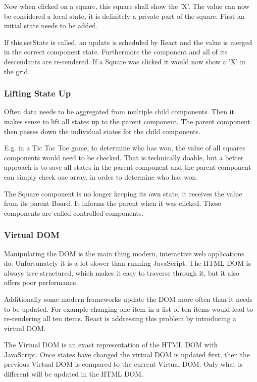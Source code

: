 Now when clicked on a square, this square shall show the 'X'. The value can now be considered a local state, it is definitely a private part of the square. First an initial state needs to be added.



If this.setState is called, an update is scheduled by React and the value is merged in the correct component state. Furthermore the component and all of its descendants are re-rendered. If a Square was clicked it would now show a 'X' in the grid.

\subsubsection{Lifting State Up}
Often data needs to be aggregated from multiple child components. Then it makes sense to lift all states up to the parent component. The parent component then passes down the individual states for the child components.

E.g. in a Tic Tac Toe game, to determine who has won, the value of all squares components would need to be checked. That is technically doable, but a better approach is to save all states in the parent component and the parent component can simply check one array, in order to determine who has won. 

The Square component is no longer keeping its own state, it receives the value from its parent Board. It informs the parent when it was clicked. These components are called controlled components. 



\subsubsection{Virtual DOM}

Manipulating the DOM is the main thing modern, interactive web applications do. Unfortunately it is a lot slower than running JavaScript. The HTML DOM is always tree structured, which makes it easy to traverse through it, but it also offers poor performance.

Additionally some modern frameworks update the DOM more often than it needs to be updated. For example changing one item in a list of ten items would lead to re-rendering all ten items. React is addressing this problem by introducing a virtual DOM.

The Virtual DOM is an exact representation of the HTML DOM with JavaScript. Once states have changed the virtual DOM is updated first, then the previous Virtual DOM is compared to the current Virtual DOM. Only what is different will be updated in the HTML DOM.

